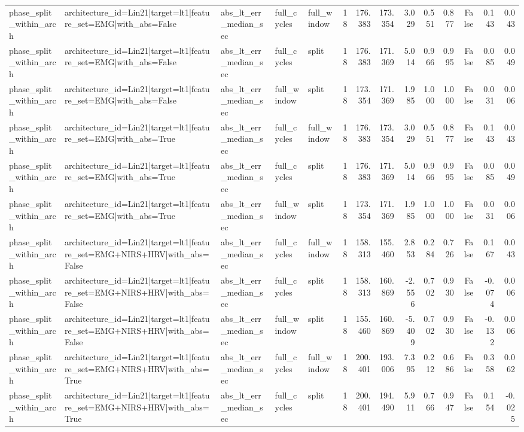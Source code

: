 \begin{table}
\begin{tabular}{lllllrrrrrrrrr}
phase_split_within_arch & architecture_id=Lin21|target=lt1|feature_set=EMG|with_abs=False & abs_lt_err_median_sec & full_cycles & full_window & 18 & 176.383 & 173.354 & 3.029 & 0.551 & 0.877 & False & 0.143 & 0.043 \\
phase_split_within_arch & architecture_id=Lin21|target=lt1|feature_set=EMG|with_abs=False & abs_lt_err_median_sec & full_cycles & split & 18 & 176.383 & 171.369 & 5.014 & 0.966 & 0.995 & False & 0.085 & 0.049 \\
phase_split_within_arch & architecture_id=Lin21|target=lt1|feature_set=EMG|with_abs=False & abs_lt_err_median_sec & full_window & split & 18 & 173.354 & 171.369 & 1.985 & 1.000 & 1.000 & False & 0.031 & 0.006 \\
phase_split_within_arch & architecture_id=Lin21|target=lt1|feature_set=EMG|with_abs=True & abs_lt_err_median_sec & full_cycles & full_window & 18 & 176.383 & 173.354 & 3.029 & 0.551 & 0.877 & False & 0.143 & 0.043 \\
phase_split_within_arch & architecture_id=Lin21|target=lt1|feature_set=EMG|with_abs=True & abs_lt_err_median_sec & full_cycles & split & 18 & 176.383 & 171.369 & 5.014 & 0.966 & 0.995 & False & 0.085 & 0.049 \\
phase_split_within_arch & architecture_id=Lin21|target=lt1|feature_set=EMG|with_abs=True & abs_lt_err_median_sec & full_window & split & 18 & 173.354 & 171.369 & 1.985 & 1.000 & 1.000 & False & 0.031 & 0.006 \\
phase_split_within_arch & architecture_id=Lin21|target=lt1|feature_set=EMG+NIRS+HRV|with_abs=False & abs_lt_err_median_sec & full_cycles & full_window & 18 & 158.313 & 155.460 & 2.853 & 0.284 & 0.726 & False & 0.167 & 0.043 \\
phase_split_within_arch & architecture_id=Lin21|target=lt1|feature_set=EMG+NIRS+HRV|with_abs=False & abs_lt_err_median_sec & full_cycles & split & 18 & 158.313 & 160.869 & -2.556 & 0.702 & 0.930 & False & -0.074 & 0.006 \\
phase_split_within_arch & architecture_id=Lin21|target=lt1|feature_set=EMG+NIRS+HRV|with_abs=False & abs_lt_err_median_sec & full_window & split & 18 & 155.460 & 160.869 & -5.409 & 0.702 & 0.930 & False & -0.132 & 0.006 \\
phase_split_within_arch & architecture_id=Lin21|target=lt1|feature_set=EMG+NIRS+HRV|with_abs=True & abs_lt_err_median_sec & full_cycles & full_window & 18 & 200.401 & 193.006 & 7.395 & 0.212 & 0.686 & False & 0.358 & 0.062 \\
phase_split_within_arch & architecture_id=Lin21|target=lt1|feature_set=EMG+NIRS+HRV|with_abs=True & abs_lt_err_median_sec & full_cycles & split & 18 & 200.401 & 194.490 & 5.911 & 0.766 & 0.947 & False & 0.154 & -0.025 \\

\end{tabular}
\end{table}
